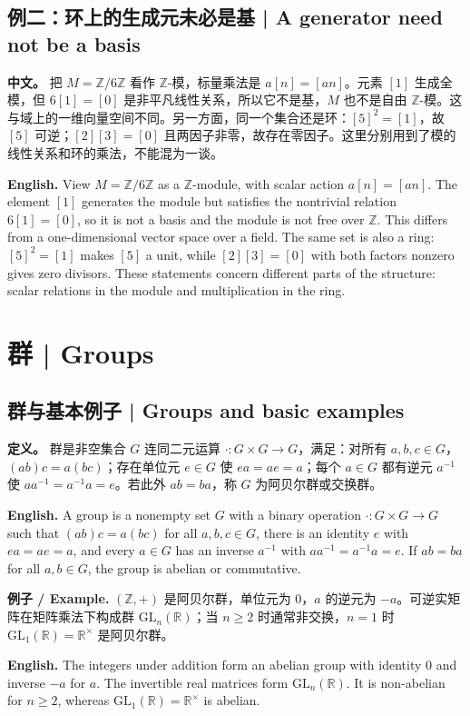 \documentclass[UTF8,11pt,a4paper]{ctexart}
\newcommand{\EN}[1]{\par\noindent\textbf{English.} #1\par}
\newcommand{\EX}[2]{\par\noindent\textbf{例子 / Example.} #1\par\EN{#2}}
\newcommand{\APS}[2]{\par\noindent\textbf{中文。} #1\par\noindent\textbf{English.} #2\par\smallskip}
\begin{document}
\subsection*{例二：环上的生成元未必是基 | A generator need not be a basis}
\APS{把 $M=\mathbb Z/6\mathbb Z$ 看作 $\mathbb Z$-模，标量乘法是 $a[n]=[an]$。元素 $[1]$ 生成全模，但 $6[1]=[0]$ 是非平凡线性关系，所以它不是基，$M$ 也不是自由 $\mathbb Z$-模。这与域上的一维向量空间不同。另一方面，同一个集合还是环：$[5]^2=[1]$，故 $[5]$ 可逆；$[2][3]=[0]$ 且两因子非零，故存在零因子。这里分别用到了模的线性关系和环的乘法，不能混为一谈。}{View $M=\mathbb Z/6\mathbb Z$ as a $\mathbb Z$-module, with scalar action $a[n]=[an]$. The element $[1]$ generates the module but satisfies the nontrivial relation $6[1]=[0]$, so it is not a basis and the module is not free over $\mathbb Z$. This differs from a one-dimensional vector space over a field. The same set is also a ring: $[5]^2=[1]$ makes $[5]$ a unit, while $[2][3]=[0]$ with both factors nonzero gives zero divisors. These statements concern different parts of the structure: scalar relations in the module and multiplication in the ring.}


\section{群 | Groups}
\subsection{群与基本例子 | Groups and basic examples}
\noindent\textbf{定义。} 群是非空集合 $G$ 连同二元运算 $\cdot:G\times G\to G$，满足：对所有 $a,b,c\in G$，$(ab)c=a(bc)$；存在单位元 $e\in G$ 使 $ea=ae=a$；每个 $a\in G$ 都有逆元 $a^{-1}$ 使 $aa^{-1}=a^{-1}a=e$。若此外 $ab=ba$，称 $G$ 为阿贝尔群或交换群。

\EN{A group is a nonempty set $G$ with a binary operation $\cdot:G\times G\to G$ such that $(ab)c=a(bc)$ for all $a,b,c\in G$, there is an identity $e$ with $ea=ae=a$, and every $a\in G$ has an inverse $a^{-1}$ with $aa^{-1}=a^{-1}a=e$. If $ab=ba$ for all $a,b\in G$, the group is abelian or commutative.}

\EX{$(\mathbb Z,+)$ 是阿贝尔群，单位元为 $0$，$a$ 的逆元为 $-a$。可逆实矩阵在矩阵乘法下构成群 $\mathrm{GL}_n(\mathbb R)$；当 $n\ge2$ 时通常非交换，$n=1$ 时 $\mathrm{GL}_1(\mathbb R)=\mathbb R^\times$ 是阿贝尔群。}{The integers under addition form an abelian group with identity $0$ and inverse $-a$ for $a$. The invertible real matrices form $\mathrm{GL}_n(\mathbb R)$. It is non-abelian for $n\ge2$, whereas $\mathrm{GL}_1(\mathbb R)=\mathbb R^\times$ is abelian.}
\end{document}

